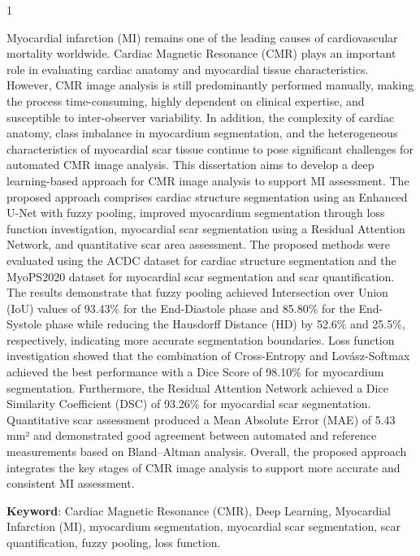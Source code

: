 \begin{spacing}{1}
	

Myocardial infarction (MI) remains one of the leading causes of cardiovascular mortality worldwide. Cardiac Magnetic Resonance (CMR) plays an important role in evaluating cardiac anatomy and myocardial tissue characteristics. However, CMR image analysis is still predominantly performed manually, making the process time-consuming, highly dependent on clinical expertise, and susceptible to inter-observer variability. In addition, the complexity of cardiac anatomy, class imbalance in myocardium segmentation, and the heterogeneous characteristics of myocardial scar tissue continue to pose significant challenges for automated CMR image analysis.
This dissertation aims to develop a deep learning-based approach for CMR image analysis to support MI assessment. The proposed approach comprises cardiac structure segmentation using an Enhanced U-Net with fuzzy pooling, improved myocardium segmentation through loss function investigation, myocardial scar segmentation using a Residual Attention Network, and quantitative scar area assessment. The proposed methods were evaluated using the ACDC dataset for cardiac structure segmentation and the MyoPS2020 dataset for myocardial scar segmentation and scar quantification.
The results demonstrate that fuzzy pooling achieved Intersection over Union (IoU) values of 93.43\% for the End-Diastole phase and 85.80\% for the End-Systole phase while reducing the Hausdorff Distance (HD) by 52.6\% and 25.5\%, respectively, indicating more accurate segmentation boundaries. Loss function investigation showed that the combination of Cross-Entropy and Lovász-Softmax achieved the best performance with a Dice Score of 98.10\% for myocardium segmentation. Furthermore, the Residual Attention Network achieved a Dice Similarity Coefficient (DSC) of 93.26\% for myocardial scar segmentation. Quantitative scar assessment produced a Mean Absolute Error (MAE) of 5.43 mm² and demonstrated good agreement between automated and reference measurements based on Bland–Altman analysis.
Overall, the proposed approach integrates the key stages of CMR image analysis to support more accurate and consistent MI assessment.


\vspace{2ex}
\textbf{Keyword}: Cardiac Magnetic Resonance (CMR), Deep Learning, Myocardial Infarction (MI), myocardium segmentation, myocardial scar segmentation, scar quantification, fuzzy pooling, loss function.
\end{spacing}